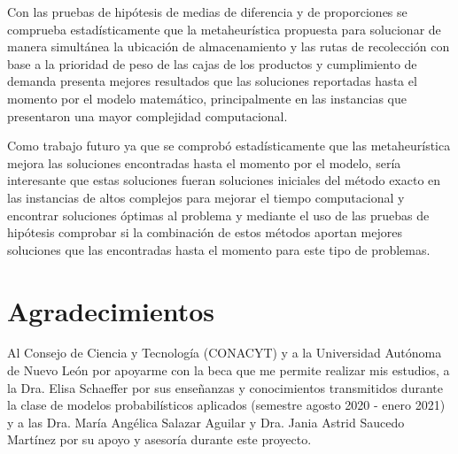 \documentclass[preprint,12pt, pdftex]{elsarticle}
\begin{document}
Con las pruebas de hipótesis de medias de diferencia y de proporciones se comprueba estadísticamente que la metaheurística propuesta para solucionar de manera simultánea la ubicación de almacenamiento y las rutas de recolección con base a la prioridad de peso de las cajas de los productos y cumplimiento de demanda presenta mejores resultados que las soluciones reportadas hasta el momento por el modelo matemático, principalmente en las instancias que presentaron una mayor complejidad computacional.

Como trabajo futuro ya que se comprobó estadísticamente que las metaheurística mejora las soluciones encontradas hasta el momento por el modelo, sería interesante que estas soluciones fueran soluciones iniciales del método exacto en las instancias de altos complejos para mejorar el tiempo computacional y encontrar soluciones óptimas al problema y mediante el uso de las pruebas de hipótesis comprobar si la combinación de estos métodos aportan mejores soluciones que las encontradas hasta el momento para este tipo de problemas.

\section{Agradecimientos}
Al Consejo de Ciencia y Tecnología (CONACYT) y a la Universidad Autónoma de Nuevo León por apoyarme con la beca que me permite realizar mis estudios, a la Dra. Elisa Schaeffer por sus enseñanzas y conocimientos transmitidos durante la clase de modelos probabilísticos aplicados (semestre agosto 2020 - enero 2021) y a las Dra. María Angélica Salazar Aguilar y Dra. Jania Astrid Saucedo Martínez por su apoyo y asesoría durante este proyecto.

% 
 






\end{document}
